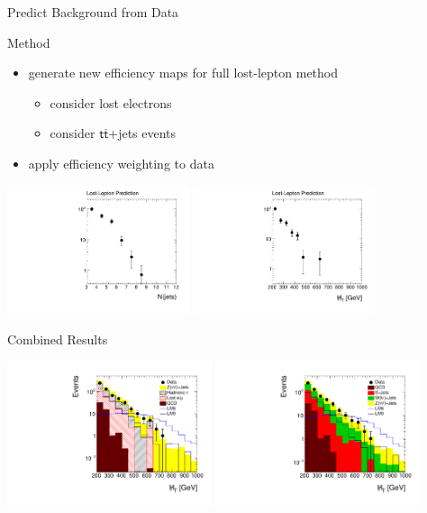 \begin{frame}{Predict Background from Data}

\begin{block}{Method}
\begin{itemize}
\item generate new efficiency maps for full lost-lepton method
\begin{itemize}
	\item consider lost electrons
	\item consider $\mathsf{t\overline{t}}$+jets events
\end{itemize}
\item apply efficiency weighting to data
\end{itemize}
\end{block} 

\begin{center}
\includegraphics[width = 0.4\textwidth]{plots11/LLPredictionNJets.pdf}
\includegraphics[width = 0.4\textwidth]{plots11/LLPredictionMHT.pdf}
\end{center}

\end{frame}



\begin{frame}{Combined Results}

\includegraphics[width = 0.45\textwidth]{plots11/hDataVsBkg_Mht.pdf}
\includegraphics[width = 0.45\textwidth]{plots11/hDataVsMC_Mht.pdf}\\
\end{frame} 
